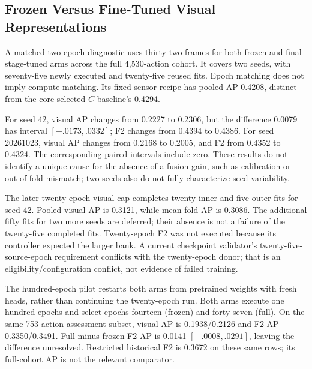 \subsection{Frozen Versus Fine-Tuned Visual Representations}
A matched two-epoch diagnostic uses thirty-two frames for both frozen and
final-stage-tuned arms across the full 4,530-action cohort. It covers two seeds, with
seventy-five newly executed and twenty-five reused fits. Epoch matching does not imply
compute matching. Its fixed sensor recipe has pooled AP 0.4208, distinct from the core
selected-$C$ baseline's 0.4294.

For seed 42, visual AP changes from 0.2227 to 0.2306, but the difference 0.0079 has
interval $[-.0173,.0332]$; F2 changes from 0.4394 to 0.4386. For seed 20261023, visual
AP changes from 0.2168 to 0.2005, and F2 from 0.4352 to 0.4324. The corresponding paired
intervals include zero. These results do not identify a unique cause for the absence of
a fusion gain, such as calibration or out-of-fold mismatch; two seeds also do not fully
characterize seed variability.

The later twenty-epoch visual cap completes twenty inner and five outer fits for seed
42. Pooled visual AP is 0.3121, while mean fold AP is 0.3086. The additional fifty fits
for two more seeds are deferred; their absence is not a failure of the twenty-five
completed fits. Twenty-epoch F2 was not executed because its controller expected the
larger bank. A current checkpoint validator's twenty-five-source-epoch requirement
conflicts with the twenty-epoch donor; that is an eligibility/configuration conflict,
not evidence of failed training.

The hundred-epoch pilot restarts both arms from pretrained weights with fresh heads,
rather than continuing the twenty-epoch run. Both arms execute one hundred epochs and
select epochs fourteen (frozen) and forty-seven (full). On the same 753-action
assessment subset, visual AP is 0.1938/0.2126 and F2 AP 0.3350/0.3491. Full-minus-frozen
F2 AP is 0.0141 $[-.0008,.0291]$, leaving the difference unresolved. Restricted
historical F2 is 0.3672 on these same rows; its full-cohort AP is not the relevant
comparator.


